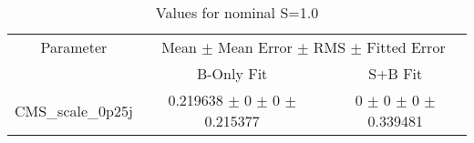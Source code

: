 \begin{table}
\centering
\caption{Values for nominal S=1.0}
\begin{tabular}{ccc}
\toprule
Parameter & \multicolumn{2}{c}{Mean $\pm$ Mean Error $\pm$ RMS $\pm$ Fitted Error}\\
 & B-Only Fit & S+B Fit\\
\midrule
CMS\_scale\_0p25j & \num{0.219638} $\pm$ \num{0} $\pm$ \num{0} $\pm$ \num{0.215377} & \num{0} $\pm$ \num{0} $\pm$ \num{0} $\pm$ \num{0.339481}\\
\bottomrule
\end{tabular}
\end{table}